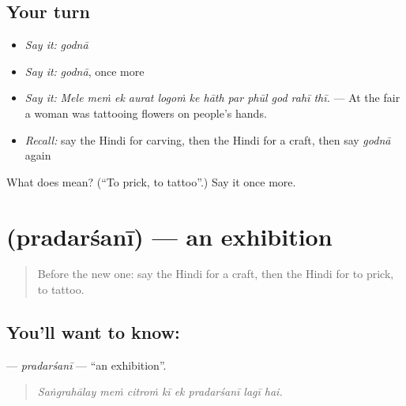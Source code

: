 \subsection*{Your turn}
\begin{itemize}
\raggedright
  \item \emph{Say it:} \emph{godnā}
  \item \emph{Say it:} \emph{godnā}, once more
  \item \emph{Say it:} \emph{Mele meṁ ek aurat logoṁ ke hāth par phūl god rahī thī.} — At the fair a woman was tattooing flowers on people's hands.
  \item \emph{Recall:} say the Hindi for carving, then the Hindi for a craft, then say \emph{godnā} again
\end{itemize}

\begin{tcolorbox}[breakable,colback=teal!4,colframe=teal!35!black,title={Before you move on}]
What does  mean? (\textquotedblleft{}To prick, to tattoo\textquotedblright{}.) Say it once more.
\end{tcolorbox}
\section[\texorpdfstring{\hi{प्रदर्शनी} (pradarśanī)}{प्रदर्शनी (pradarśanī)}]{ (pradarśanī) — an exhibition}

\label{lesson:HI-C528-pradarsani}



\begin{quote}
Before the new one: say the Hindi for a craft, then the Hindi for to prick, to tattoo.
\end{quote}

\subsection*{You'll want to know: }
\textbf{} — \emph{pradarśanī} — \textquotedblleft{}an exhibition\textquotedblright{}.

\begin{quote}
       
\end{quote}

\begin{quote}
\emph{Saṅgrahālay meṁ citroṁ kī ek pradarśanī lagī hai.}
\end{quote}

